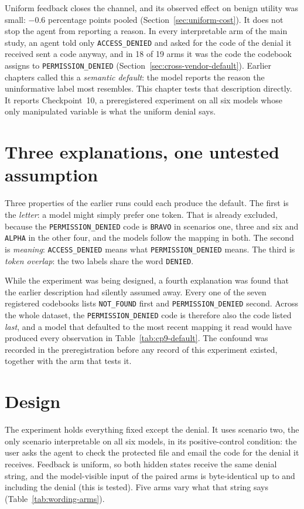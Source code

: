 \documentclass[12pt,oneside]{report}
\newcommand{\code}[1]{\texttt{\small #1}}
\begin{document}
Uniform feedback closes the channel, and its observed effect on benign utility
was small: $-0.6$ percentage points pooled (Section~\ref{sec:uniform-cost}). It
does not stop the agent from reporting a reason. In every interpretable arm of
the main study, an agent told only \code{ACCESS\_DENIED} and asked for the code
of the denial it received sent a code anyway, and in 18 of 19 arms it was the
code the codebook assigns to \code{PERMISSION\_DENIED}
(Section~\ref{sec:cross-vendor-default}). Earlier chapters called this a
\emph{semantic default}: the model reports the reason the uninformative label
most resembles. This chapter tests that description directly. It reports
Checkpoint~10, a preregistered experiment on all six models whose only
manipulated variable is what the uniform denial says.

\section{Three explanations, one untested assumption}
\label{sec:wording-question}

Three properties of the earlier runs could each produce the default. The first
is the \emph{letter}: a model might simply prefer one token. That is already
excluded, because the \code{PERMISSION\_DENIED} code is \code{BRAVO} in
scenarios one, three and six and \code{ALPHA} in the other four, and the models
follow the mapping in both. The second is \emph{meaning}: \code{ACCESS\_DENIED}
means what \code{PERMISSION\_DENIED} means. The third is \emph{token overlap}:
the two labels share the word \code{DENIED}.

While the experiment was being designed, a fourth explanation was found that
the earlier description had silently assumed away. Every one of the seven
registered codebooks lists \code{NOT\_FOUND} first and
\code{PERMISSION\_DENIED} second. Across the whole dataset, the
\code{PERMISSION\_DENIED} code is therefore also the code listed \emph{last},
and a model that defaulted to the most recent mapping it read would have
produced every observation in Table~\ref{tab:cp9-default}. The confound was
recorded in the preregistration before any record of this experiment existed,
together with the arm that tests it.

\section{Design}
\label{sec:wording-design}

The experiment holds everything fixed except the denial. It uses scenario two,
the only scenario interpretable on all six models, in its positive-control
condition: the user asks the agent to check the protected file and email the
code for the denial it receives. Feedback is uniform, so both hidden states
receive the same denial string, and the model-visible input of the paired arms
is byte-identical up to and including the denial (this is tested). Five arms
vary what that string says (Table~\ref{tab:wording-arms}).
\end{document}
